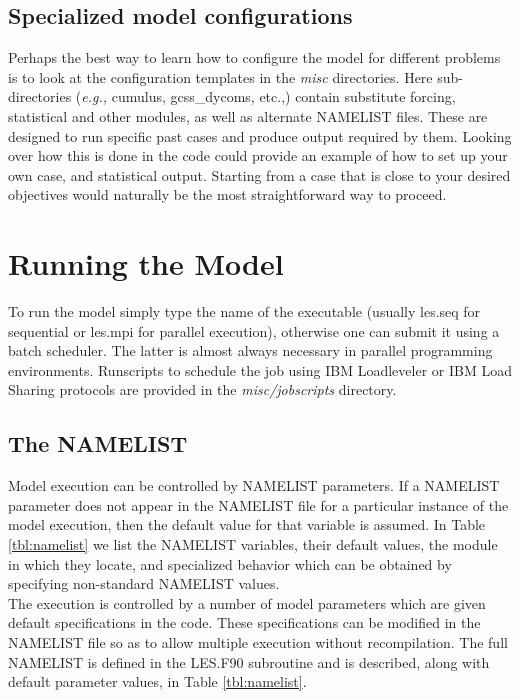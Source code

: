 \documentclass[11pt,a4paper]{article}
\begin{document}
\subsection{Specialized model configurations}
Perhaps the best way to learn how to configure the model for different
problems is to look at the configuration templates in the \emph{misc}
directories.  Here sub-directories (\emph{e.g.,} cumulus, gcss\_dycoms,
etc.,) contain substitute forcing, statistical and other modules, as
well as alternate NAMELIST files.  These are designed to run specific
past cases and produce output required by them.  Looking over how this
is done in the code could provide an example of how to set up your own
case, and statistical output.  Starting from a case that is close to
your desired objectives would naturally be the most straightforward
way to proceed.

\section{Running the Model}
To run the model simply type the name of the executable (usually les.seq
for sequential or les.mpi for parallel execution), otherwise one can 
submit it using a batch scheduler. The latter is almost always
necessary in parallel programming environments. Runscripts to
schedule the job using IBM Loadleveler or IBM Load Sharing protocols
are provided in the \emph{misc/jobscripts} directory.

\subsection{The NAMELIST}
Model execution can be controlled by NAMELIST parameters. If a
NAMELIST parameter does not appear in the NAMELIST file for a
particular instance of the model execution, then the default value for that
variable is assumed.  In Table \ref{tbl:namelist} we list the NAMELIST
variables, their default values, the module in which they locate, and
specialized behavior which can be obtained by specifying non-standard
NAMELIST values.
\\
The execution is controlled by a number of model parameters which are
given default specifications in the code. These specifications can be
modified in the NAMELIST file so as to allow multiple execution
without recompilation.  The full NAMELIST is defined in the LES.F90
subroutine and is described, along with default parameter values, in Table \ref{tbl:namelist}. 

\clearpage
\end{document}
